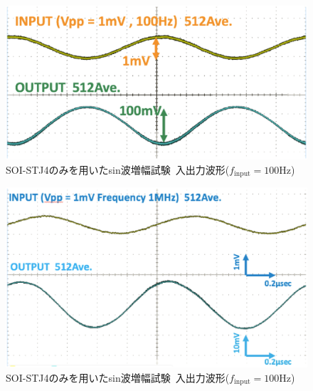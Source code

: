 			\begin{figure}[htbp]
				\begin{center}
					\includegraphics[width=12.0cm]{./Chapter/Chapter4/Picture/SOISTJ4woSTJ_InOut_100Hz.eps}
					\caption{SOI-STJ4のみを用いたsin波増幅試験\ 入出力波形($f_{\mathrm{input}}=100\mathrm{Hz}$)}
					\label{fig:SOISTJ4woSTJ_InOut_100Hz}
				\end{center}
			\end{figure}
			\begin{figure}[htbp]
				\begin{center}
					\includegraphics[width=12.0cm]{./Chapter/Chapter4/Picture/SOISTJ4woSTJ_InOut_1MHz.eps}
					\caption{SOI-STJ4のみを用いたsin波増幅試験\ 入出力波形($f_{\mathrm{input}}=100\mathrm{Hz}$)}
					\label{fig:SOISTJ4woSTJ_InOut_1MHz}
				\end{center}
			\end{figure}
			
